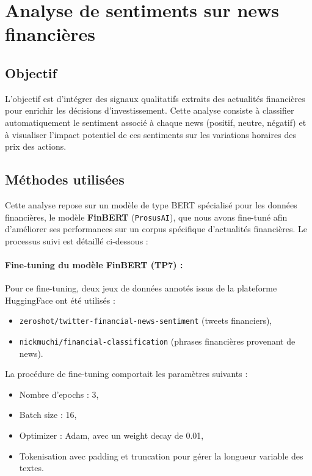 \documentclass[a4paper,12pt]{article}
\begin{document}
\section{Analyse de sentiments sur news financières}

\subsection*{Objectif}

L'objectif est d'intégrer des signaux qualitatifs extraits des actualités financières pour enrichir les décisions d’investissement. Cette analyse consiste à classifier automatiquement le sentiment associé à chaque news (positif, neutre, négatif) et à visualiser l'impact potentiel de ces sentiments sur les variations horaires des prix des actions.

\subsection*{Méthodes utilisées}

Cette analyse repose sur un modèle de type BERT spécialisé pour les données financières, le modèle \textbf{FinBERT} (\texttt{ProsusAI}), que nous avons fine-tuné afin d'améliorer ses performances sur un corpus spécifique d'actualités financières. Le processus suivi est détaillé ci-dessous :

\paragraph{Fine-tuning du modèle FinBERT (TP7) :}  
Pour ce fine-tuning, deux jeux de données annotés issus de la plateforme HuggingFace ont été utilisés :
\begin{itemize}
    \item \texttt{zeroshot/twitter-financial-news-sentiment} (tweets financiers),
    \item \texttt{nickmuchi/financial-classification} (phrases financières provenant de news).
\end{itemize}

La procédure de fine-tuning comportait les paramètres suivants :
\begin{itemize}
    \item Nombre d'epochs : 3,
    \item Batch size : 16,
    \item Optimizer : Adam, avec un weight decay de 0.01,
    \item Tokenisation avec padding et truncation pour gérer la longueur variable des textes.
\end{itemize}
\end{document}
